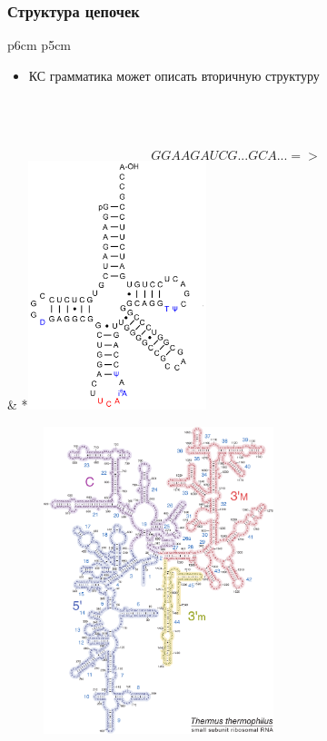 \documentclass{beamer}
\begin{document}
    \begin{frame}
    \frametitle{Структура цепочек}
    \begin{tabular}{p{6cm} p{5cm}}
        \begin{itemize}
            \item КС грамматика может описать вторичную структуру
        \end{itemize}
        \\
        \\
        \\
        $$
        GGAAGAUCG...GCA...  =>
        $$
        &
        *{\includegraphics[width=5.2cm]{pictures/TRNA.png}}
    \end{tabular}  
    
    \end{frame}
    
    \begin{frame}
        \begin{figure}[t]
            \centering
            \includegraphics[width=6.7cm]{pictures/thermus_16s_2ndry.pdf}
        \end{figure}
    \end{frame}
\end{document}
